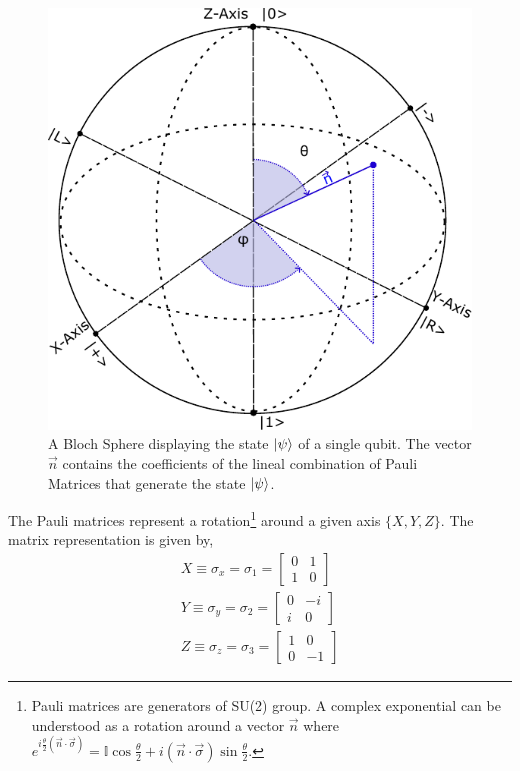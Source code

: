 \begin{figure}[h]
    \centering
    \includegraphics[scale=0.8]{Figures/BlochSphere_Layer 1.pdf}
    \caption{A Bloch Sphere displaying the state $\ket{\psi}$ of a single qubit. The vector $\vec{n}$ contains the coefficients of the lineal combination of Pauli Matrices that generate the state $\ket{\psi}$.}
    \label{fig:bloch_sphere}
\end{figure}
The Pauli matrices represent a rotation\footnote{Pauli matrices are generators of SU(2) group. A complex exponential can be understood as a rotation around a vector $\vec{n}$ where $e^{i\frac{\theta}{2}(\vec{n}\cdot \vec{\sigma})} = \mathbb{I}\cos{\frac{\theta}{2}} + i(\vec{n}\cdot \vec{\sigma})\sin{\frac{\theta}{2}}$.} around a given axis $\{X, Y, Z \}$. The matrix representation is given by,
\begin{align*}
X \equiv \sigma_{x} = \sigma_{1} = 
    \begin{bmatrix}
           0 & 1 \\
           1 & 0 
         \end{bmatrix} \\
Y \equiv \sigma_{y} = \sigma_{2} = 
    \begin{bmatrix}
           0 & -i \\
           i & 0 
         \end{bmatrix} \\ 
Z \equiv \sigma_{z} = \sigma_{3} = 
    \begin{bmatrix}
           1 & 0 \\
           0 & -1 
         \end{bmatrix}
\end{align*}
